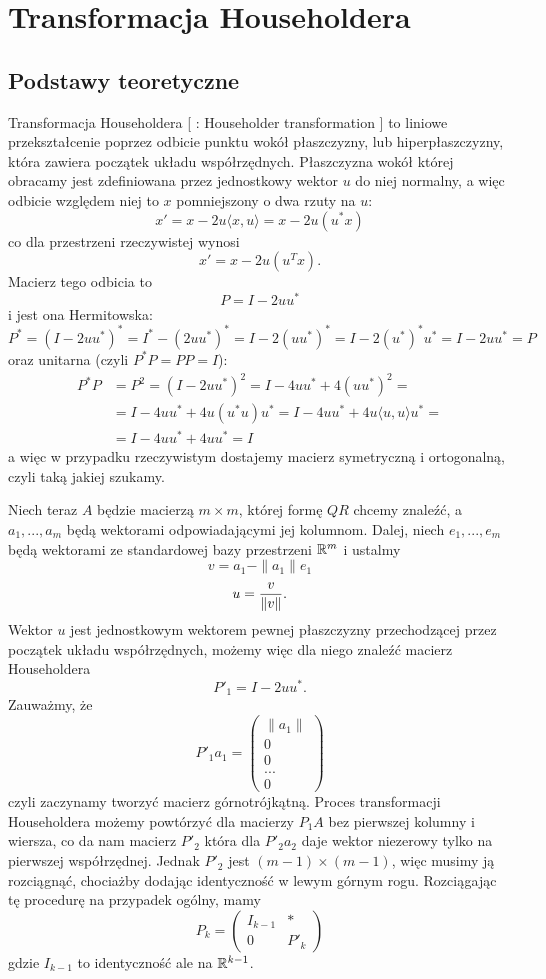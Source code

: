 \section{Transformacja Householdera}

\subsection{Podstawy teoretyczne}

Transformacja Householdera [ : Householder transformation ] to liniowe przekształcenie poprzez odbicie punktu wokół płaszczyzny, lub hiperpłaszczyzny, która zawiera początek układu współrzędnych. Płaszczyzna wokół której obracamy jest zdefiniowana przez jednostkowy wektor $u$ do niej normalny, a więc odbicie względem niej to $x$ pomniejszony o dwa rzuty na $u$:
$$x'=x-2u\langle x,u\rangle=x-2u(u^*x)$$
co dla przestrzeni rzeczywistej wynosi
$$x'=x-2u(u^Tx).$$
Macierz tego odbicia to
$$P=I-2uu^*$$
i jest ona Hermitowska:
$$P^*=(I-2uu^*)^*=I^*-(2uu^*)^*=I-2(uu^*)^*=I-2(u^*)^*u^*=I-2uu^*=P$$
oraz unitarna (czyli $P^*P=PP=I$):
\begin{align*}
    P^*P&=P^2=(I-2uu^*)^2=I-4uu^*+4(uu^*)^2=\\
    &=I-4uu^*+4u(u^*u)u^*=I-4uu^*+4u\langle u,u\rangle u^*=\\
    &=I-4uu^*+4uu^*=I
\end{align*}
a więc w przypadku rzeczywistym dostajemy macierz symetryczną i ortogonalną, czyli taką jakiej szukamy.

Niech teraz $A$ będzie macierzą $m\times m$, której formę $QR$ chcemy znaleźć, a $a_1,...,a_m$ będą wektorami odpowiadającymi jej kolumnom. Dalej, niech $e_1,...,e_m$ będą wektorami ze standardowej bazy przestrzeni $\mathbb{R}^m$ i ustalmy
$$v=a_1-\|a_1\|e_1$$
$$u={v\over\|v\|}.$$
Wektor $u$ jest jednostkowym wektorem pewnej płaszczyzny przechodzącej przez początek układu współrzędnych, możemy więc dla niego znaleźć macierz Householdera
$$P'_1=I-2uu^*.$$
Zauważmy, że
$$P'_1a_1=\begin{pmatrix}\|a_1\|\\0\\0\\...\\0\end{pmatrix}$$
czyli zaczynamy tworzyć macierz górnotrójkątną. Proces transformacji Householdera możemy powtórzyć dla macierzy $P_1A$ bez pierwszej kolumny i wiersza, co da nam macierz $P'_2$ która dla $P'_2a_2$ daje wektor niezerowy tylko na pierwszej współrzędnej. Jednak $P'_2$ jest $(m-1)\times(m-1)$, więc musimy ją rozciągnąć, chociażby dodając identyczność w lewym górnym rogu. Rozciągając tę procedurę na przypadek ogólny, mamy
$$P_k=\begin{pmatrix}
    I_{k-1}&*\\
    0&P'_k
\end{pmatrix}$$
gdzie $I_{k-1}$ to identyczność ale na $\mathbb{R}^{k-1}$. 

